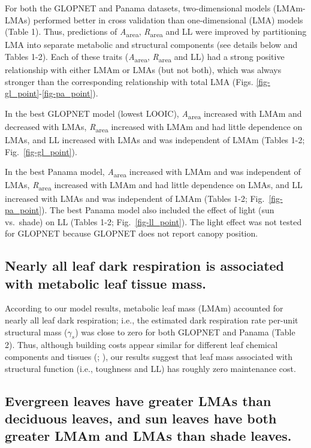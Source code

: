 \documentclass[
  12pt,
  letterpaper,
  DIV=11,
  numbers=noendperiod]{scrartcl}
\begin{document}
For both the GLOPNET and Panama datasets, two-dimensional models
(LMAm-LMAs) performed better in cross validation than one-dimensional
(LMA) models (Table 1). Thus, predictions of
\emph{A}\textsubscript{area}, \emph{R}\textsubscript{area} and LL were
improved by partitioning LMA into separate metabolic and structural
components (see details below and Tables 1-2). Each of these traits
(\emph{A}\textsubscript{area}, \emph{R}\textsubscript{area} and LL) had
a strong positive relationship with either LMAm or LMAs (but not both),
which was always stronger than the corresponding relationship with total
LMA (Figs. \ref{fig-gl_point}-\ref{fig-pa_point}).

In the best GLOPNET model (lowest LOOIC), \emph{A}\textsubscript{area}
increased with LMAm and decreased with LMAs,
\emph{R}\textsubscript{area} increased with LMAm and had little
dependence on LMAs, and LL increased with LMAs and was independent of
LMAm (Tables 1-2; Fig.~\ref{fig-gl_point}).

In the best Panama model, \emph{A}\textsubscript{area} increased with
LMAm and was independent of LMAs, \emph{R}\textsubscript{area} increased
with LMAm and had little dependence on LMAs, and LL increased with LMAs
and was independent of LMAm (Tables 1-2; Fig.~\ref{fig-pa_point}). The
best Panama model also included the effect of light (sun vs.~shade) on
LL (Tables 1-2; Fig.~\ref{fig-ll_point}). The light effect was not
tested for GLOPNET because GLOPNET does not report canopy position.

\subsection{Nearly all leaf dark respiration is associated with
metabolic leaf tissue
mass.}\label{nearly-all-leaf-dark-respiration-is-associated-with-metabolic-leaf-tissue-mass.}

According to our model results, metabolic leaf mass (LMAm) accounted for
nearly all leaf dark respiration; i.e., the estimated dark respiration
rate per-unit structural mass (\(\gamma_s\)) was close to zero for both
GLOPNET and Panama (Table 2). Thus, although building costs appear
similar for different leaf chemical components and tissues
(;
), our results suggest
that leaf mass associated with structural function (i.e., toughness and
LL) has roughly zero maintenance cost.

\subsection{Evergreen leaves have greater LMAs than deciduous leaves,
and sun leaves have both greater LMAm and LMAs than shade
leaves.}\label{evergreen-leaves-have-greater-lmas-than-deciduous-leaves-and-sun-leaves-have-both-greater-lmam-and-lmas-than-shade-leaves.}
\end{document}
